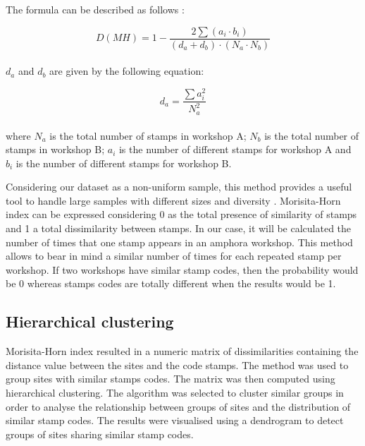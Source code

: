 \documentclass[review]{elsarticle}
\newcommand{\memo}[2]{\textcolor{#1}{#2}}
\newcommand{\xavi}[1]{\memo{magenta}{XRC: #1\\}}
\begin{document}
The formula can be described as follows \citep{magurran_measuring_2013}:

\begin{equation}
D(MH) = 1- \frac{2 \sum(a_{i} \cdot b_{i})}{(d_{a} + d_{b}) \cdot (N_{a} \cdot N_{b})}
\end{equation} \\

$d_{a}$ and $d_{b}$ are given by the following equation:

\begin{equation}
d_{a} = \frac{\sum a_{i}^{2}}{N_{a}^{2}} 
\end{equation} \\

where $N_{a}$ is the total number of stamps in workshop A; $N_{b}$ is the total number of stamps in workshop B; $a_{i}$ is the number of different stamps for workshop A and $b_{i}$ is the number of different stamps for workshop B.

Considering our dataset as a non-uniform sample, this method provides a useful tool to handle large samples with different sizes and diversity \citep{wolda_similarity_1981}. Morisita-Horn index can be expressed considering 0 as the total presence of similarity of stamps and 1 a total dissimilarity between stamps. In our case, it will be calculated the number of times that one stamp appears in an amphora workshop. This method allows to bear in mind a similar number of times for each repeated stamp per workshop. If two workshops have similar stamp codes, then the probability would be 0 whereas stamps codes are totally different when the results would be 1. 

\subsection{Hierarchical clustering}

Morisita-Horn index resulted in a numeric matrix of dissimilarities containing the distance value between the sites and the code stamps. The method was used to group sites with similar stamps codes. The matrix was then computed using hierarchical clustering. The algorithm was selected to cluster similar groups in order to analyse the relationship between groups of sites and the distribution of similar stamp codes. The results were visualised using a dendrogram to detect groups of sites sharing similar stamp codes.  


\end{document}
